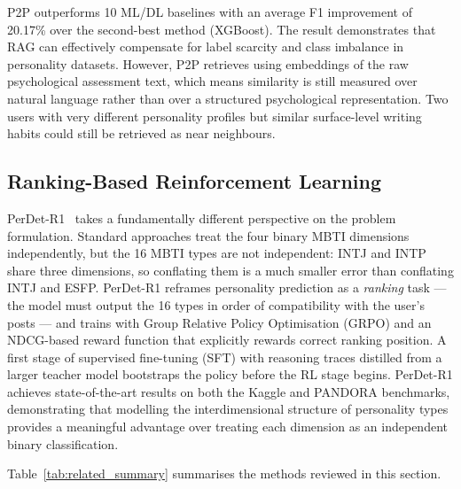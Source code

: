 \documentclass[../main.tex]{subfiles}
\begin{document}
P2P outperforms 10 ML/DL baselines with an average F1 improvement of 20.17\% over the second-best method (XGBoost). The result demonstrates that RAG can effectively compensate for label scarcity and class imbalance in personality datasets. However, P2P retrieves using embeddings of the raw psychological assessment text, which means similarity is still measured over natural language rather than over a structured psychological representation. Two users with very different personality profiles but similar surface-level writing habits could still be retrieved as near neighbours.

\subsection{Ranking-Based Reinforcement Learning}

PerDet-R1~\cite{cao2026classification} takes a fundamentally different perspective on the problem formulation. Standard approaches treat the four binary MBTI dimensions independently, but the 16 MBTI types are not independent: INTJ and INTP share three dimensions, so conflating them is a much smaller error than conflating INTJ and ESFP. PerDet-R1 reframes personality prediction as a \emph{ranking} task --- the model must output the 16 types in order of compatibility with the user's posts --- and trains with Group Relative Policy Optimisation (GRPO) and an NDCG-based reward function that explicitly rewards correct ranking position. A first stage of supervised fine-tuning (SFT) with reasoning traces distilled from a larger teacher model bootstraps the policy before the RL stage begins. PerDet-R1 achieves state-of-the-art results on both the Kaggle and PANDORA benchmarks, demonstrating that modelling the interdimensional structure of personality types provides a meaningful advantage over treating each dimension as an independent binary classification.

Table~\ref{tab:related_summary} summarises the methods reviewed in this section.
\end{document}
